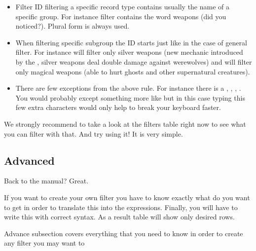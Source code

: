 \begin{itemize}
 \item Filter ID filtering a specific record type contains usually the name of a specific group. For instance  filter  contains the word weapons (did you noticed?). Plural form is always used.
 \item When filtering specific subgroup the ID starts just like in the case of general filter. For instance  will  filter only silver weapons (new mechanic introduced by the \BM{}, silver weapons deal double damage against werewolves) and  will filter only magical weapons (able to hurt ghosts and other supernatural creatures).
 \item There are few exceptions from the above rule. For instance there is a , ,        , . You would probably except something more like  but in this case typing this few extra characters would only help to break your keyboard faster.
\end{itemize}

We strongly recommend to take a look at the filters table right now to see what you can filter with that. And try using it! It is very simple.

\subsection{Advanced}
Back to the manual? Great.

If you want to create your own filter you have to know exactly what do you want to get in order to translate this into the expressions. Finally, you will have to write this with correct syntax. As a result table will show only desired rows.

Advance subsection covers everything that you need to know in order to create any filter you may want to %

